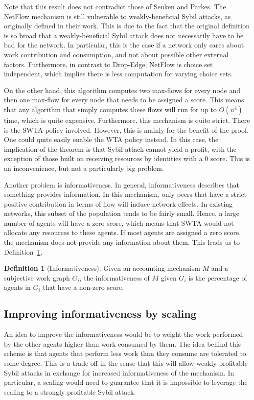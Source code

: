 \documentclass[a4paper,11pt]{book}
\theoremstyle{definition}
\newtheorem{definition}{Definition}
\begin{document}
Note that this result does not contradict those of Seuken and Parkes. The NetFlow mechanism is
still vulnerable to weakly-beneficial Sybil attacks, as originally defined in their work. 
This is due to the fact that the original definition is so broad that
a weakly-beneficial Sybil attack does not necessarily have to be bad for the network.
In particular, this is the case if a network only cares about work contribution and consumption, and
not about possible other external factors. Furthermore, in contrast to Drop-Edge, NetFlow
is choice set independent, which implies there is less computation for varying choice sets.


On the other hand, this algorithm computes two max-flows for every node and then one max-flow for
every node that needs to be assigned a score. This means that any algorithm that simply computes
these flows will run for up to $O(n^4)$ time, which is quite expensive. 
Furthermore, this mechanism is quite strict. There is the SWTA policy involved. However,
this is mainly for the benefit of the proof. One could quite easily enable the WTA policy instead.
In this case, the implication of the theorem is that Sybil attack cannot yield a profit, with the exception
of those built on receiving resources by identities with a $0$ score. This is an inconvenience,
but not a particularly big problem. 

Another problem is informativeness. In general, informativeness describes that something provides
information. In this mechanism,
only peers that have a strict positive contribution in terms of flow will induce network effects.
In existing networks, this subset of the population tends to be fairly small. Hence, a large
number of agents will have a zero score, which means that SWTA would not allocate any resources
to these agents. If most agents are assigned a zero score, the mechanism does not provide any information
about them. This leads us to Definition~\ref{def:informativeness}.

\begin{definition}[Informativeness]
    Given an accounting mechanism $M$ and a subjective work graph $G_i$, the informativeness of
    $M$ given $G_i$ is the percentage of agents in $G_i$ that have a non-zero score.
    \label{def:informativeness}
\end{definition}


\subsection{Improving informativeness by scaling}
An idea to improve the informativeness would be to weight the work performed by the other
agents higher than work consumed by them. The idea behind this scheme is that agents
that perform less work than they consume are tolerated to some degree. This is a trade-off
in the sense that this will allow weakly profitable Sybil attacks in exchange for increased
informativeness of the mechanism. In particular, a scaling would need to guarantee
that it is impossible to leverage the scaling to a strongly profitable Sybil attack. 
\end{document}
